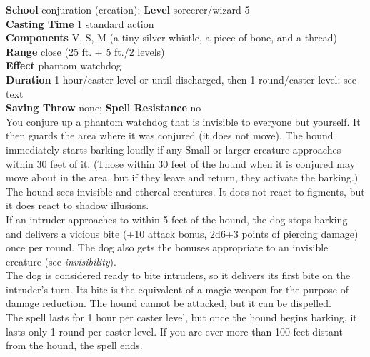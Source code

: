 \textbf{School} conjuration (creation); \textbf{Level} sorcerer/wizard 5\\
\textbf{Casting Time} 1 standard action\\
\textbf{Components} V, S, M (a tiny silver whistle, a piece of bone, and a thread)\\
\textbf{Range} close (25 ft. + 5 ft./2 levels)\\
\textbf{Effect} phantom watchdog\\
\textbf{Duration} 1 hour/caster level or until discharged, then 1 round/caster level; see text\\
\textbf{Saving Throw} none; \textbf{Spell Resistance} no\\
You conjure up a phantom watchdog that is invisible to everyone but yourself. It then guards the area where it was conjured (it does not move). The hound immediately starts barking loudly if any Small or larger creature approaches within 30 feet of it. (Those within 30 feet of the hound when it is conjured may move about in the area, but if they leave and return, they activate the barking.) The hound sees invisible and ethereal creatures. It does not react to figments, but it does react to shadow illusions.\\
If an intruder approaches to within 5 feet of the hound, the dog stops barking and delivers a vicious bite (+10 attack bonus, 2d6+3 points of piercing damage) once per round. The dog also gets the bonuses appropriate to an invisible creature (see \textit{invisibility}).\\
The dog is considered ready to bite intruders, so it delivers its first bite on the intruder's turn. Its bite is the equivalent of a magic weapon for the purpose of damage reduction. The hound cannot be attacked, but it can be dispelled.\\
The spell lasts for 1 hour per caster level, but once the hound begins barking, it lasts only 1 round per caster level. If you are ever more than 100 feet distant from the hound, the spell ends.\\
